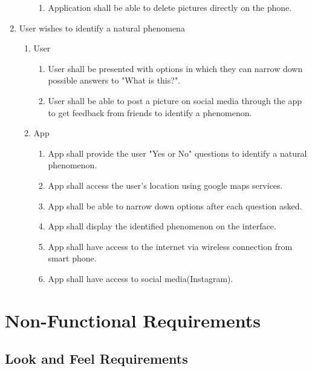 \documentclass[]{article}
\begin{document}
\begin{enumerate}[{BE}1.]
\begin{enumerate}[{VP2}.1]
\begin{enumerate}
				\item Application shall be able to delete pictures directly on the phone.
			\end{enumerate}
	\end{enumerate}
	\item User wishes to identify a natural phenomena
	\begin{enumerate}[{VP2}.1]
		\item User
			\begin{enumerate}
				\item User shall be presented with options in which they can narrow down possible answers to "What is this?".
				\item User shall be able to post a picture on social media through the app to get feedback from friends to identify a phenomenon.
								
			\end{enumerate}
		\item App
			\begin{enumerate}
				\item App shall provide the user "Yes or No" questions to identify a natural phenomenon.
				\item App shall access the user's location using google maps services.
				\item App shall be able to narrow down options after each question asked. 
				\item App shall display the identified phenomenon on the interface.
				\item App shall have access to the internet via wireless connection from smart phone.
				\item App shall have access to social media(Instagram). 
				
				
			\end{enumerate}
	\end{enumerate}
\end{enumerate}


\section{Non-Functional Requirements}
\label{sec:non-functional_requirements}
\subsection{Look and Feel Requirements}
\label{sub:look_and_feel_requirements}
\end{document}
